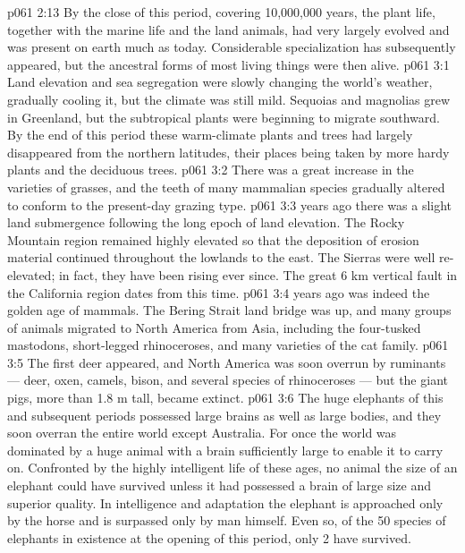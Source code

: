 \vs p061 2:13 \pc By the close of this  period, covering 10,000,000 years, the plant life, together with the marine life and the land animals, had very largely evolved and was present on earth much as today. Considerable specialization has subsequently appeared, but the ancestral forms of most living things were then alive.
\vs p061 3:1 Land elevation and sea segregation were slowly changing the world’s weather, gradually cooling it, but the climate was still mild. Sequoias and magnolias grew in Greenland, but the subtropical plants were beginning to migrate southward. By the end of this period these warm\hyp{}climate plants and trees had largely disappeared from the northern latitudes, their places being taken by more hardy plants and the deciduous trees.
\vs p061 3:2 There was a great increase in the varieties of grasses, and the teeth of many mammalian species gradually altered to conform to the present\hyp{}day grazing type.
\vs p061 3:3 \pc {} years ago there was a slight land submergence following the long epoch of land elevation. The Rocky Mountain region remained highly elevated so that the deposition of erosion material continued throughout the lowlands to the east. The Sierras were well re\hyp{}elevated; in fact, they have been rising ever since. The great 6 km vertical fault in the California region dates from this time.
\vs p061 3:4 \pc {} years ago was indeed the golden age of mammals. The Bering Strait land bridge was up, and many groups of animals migrated to North America from Asia, including the four\hyp{}tusked mastodons, short\hyp{}legged rhinoceroses, and many varieties of the cat family.
\vs p061 3:5 The first deer appeared, and North America was soon overrun by ruminants --- deer, oxen, camels, bison, and several species of rhinoceroses --- but the giant pigs, more than 1.8 m tall, became extinct.
\vs p061 3:6 The huge elephants of this and subsequent periods possessed large brains as well as large bodies, and they soon overran the entire world except Australia. For once the world was dominated by a huge animal with a brain sufficiently large to enable it to carry on. Confronted by the highly intelligent life of these ages, no animal the size of an elephant could have survived unless it had possessed a brain of large size and superior quality. In intelligence and adaptation the elephant is approached only by the horse and is surpassed only by man himself. Even so, of the 50 species of elephants in existence at the opening of this period, only 2 have survived.
